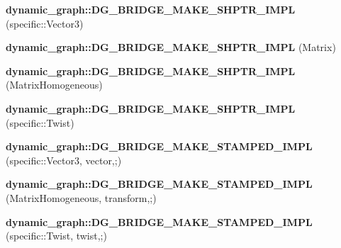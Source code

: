 \begin{DoxyCompactItemize}
\item 
{\bfseries dynamic\+\_\+graph\+::\+D\+G\+\_\+\+B\+R\+I\+D\+G\+E\+\_\+\+M\+A\+K\+E\+\_\+\+S\+H\+P\+T\+R\+\_\+\+I\+M\+PL} (specific\+::\+Vector3)\hypertarget{namespacedynamic__graph_a325010454ba7c2835ab21badc5fd1938}{}\label{namespacedynamic__graph_a325010454ba7c2835ab21badc5fd1938}

\item 
{\bfseries dynamic\+\_\+graph\+::\+D\+G\+\_\+\+B\+R\+I\+D\+G\+E\+\_\+\+M\+A\+K\+E\+\_\+\+S\+H\+P\+T\+R\+\_\+\+I\+M\+PL} (Matrix)\hypertarget{namespacedynamic__graph_a9f8a93a86c41c53460cbe62b1838a12f}{}\label{namespacedynamic__graph_a9f8a93a86c41c53460cbe62b1838a12f}

\item 
{\bfseries dynamic\+\_\+graph\+::\+D\+G\+\_\+\+B\+R\+I\+D\+G\+E\+\_\+\+M\+A\+K\+E\+\_\+\+S\+H\+P\+T\+R\+\_\+\+I\+M\+PL} (Matrix\+Homogeneous)\hypertarget{namespacedynamic__graph_a15169d3d19abe3ecd077c806664016f2}{}\label{namespacedynamic__graph_a15169d3d19abe3ecd077c806664016f2}

\item 
{\bfseries dynamic\+\_\+graph\+::\+D\+G\+\_\+\+B\+R\+I\+D\+G\+E\+\_\+\+M\+A\+K\+E\+\_\+\+S\+H\+P\+T\+R\+\_\+\+I\+M\+PL} (specific\+::\+Twist)\hypertarget{namespacedynamic__graph_a7a18758dda76357a81bb50eeef37a4a7}{}\label{namespacedynamic__graph_a7a18758dda76357a81bb50eeef37a4a7}

\item 
{\bfseries dynamic\+\_\+graph\+::\+D\+G\+\_\+\+B\+R\+I\+D\+G\+E\+\_\+\+M\+A\+K\+E\+\_\+\+S\+T\+A\+M\+P\+E\+D\+\_\+\+I\+M\+PL} (specific\+::\+Vector3, vector,;)\hypertarget{namespacedynamic__graph_a474a4d9778680dcc39de26f815269b5c}{}\label{namespacedynamic__graph_a474a4d9778680dcc39de26f815269b5c}

\item 
{\bfseries dynamic\+\_\+graph\+::\+D\+G\+\_\+\+B\+R\+I\+D\+G\+E\+\_\+\+M\+A\+K\+E\+\_\+\+S\+T\+A\+M\+P\+E\+D\+\_\+\+I\+M\+PL} (Matrix\+Homogeneous, transform,;)\hypertarget{namespacedynamic__graph_a5f97d0a8fadb5d64c79d70749663bb04}{}\label{namespacedynamic__graph_a5f97d0a8fadb5d64c79d70749663bb04}

\item 
{\bfseries dynamic\+\_\+graph\+::\+D\+G\+\_\+\+B\+R\+I\+D\+G\+E\+\_\+\+M\+A\+K\+E\+\_\+\+S\+T\+A\+M\+P\+E\+D\+\_\+\+I\+M\+PL} (specific\+::\+Twist, twist,;)\hypertarget{namespacedynamic__graph_ad61ef9228a8796b5ad676f1dc3f7fa24}{}\label{namespacedynamic__graph_ad61ef9228a8796b5ad676f1dc3f7fa24}


\end{DoxyCompactItemize}
